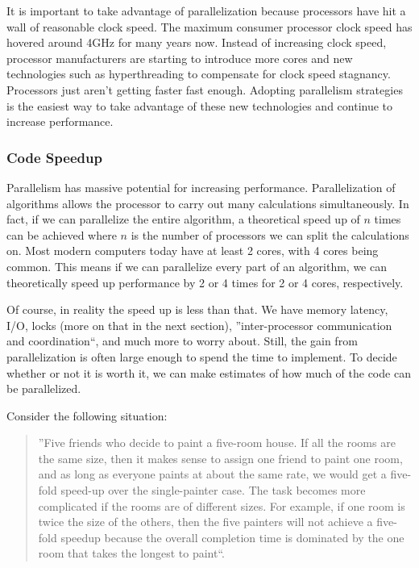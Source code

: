 \documentclass[letterpaper, 11pt]{article}
\begin{document}
\par\vspace{\baselineskip}

It is important to take advantage of parallelization because processors have hit a wall of
reasonable clock speed\citep{processorspeed}. The maximum consumer processor clock speed has
hovered around 4GHz for many years now. Instead of increasing clock speed, processor
manufacturers are starting to introduce more cores and new technologies such as hyperthreading
to compensate for clock speed stagnancy. Processors just aren't getting faster fast enough.
Adopting parallelism strategies is the easiest way to take advantage of these new technologies
and continue to increase performance.

\subsubsection{Code Speedup}
Parallelism has massive potential for increasing performance. Parallelization of algorithms
allows the processor to carry out many calculations simultaneously. In fact, if we can
parallelize the entire algorithm, a theoretical speed up of $n$ times can be
achieved where $n$ is the number of processors we can split the calculations on.
Most modern computers today have at least 2 cores, with 4 cores being common. This means
if we can parallelize every part of an algorithm, we can theoretically speed up performance
by 2 or 4 times for 2 or 4 cores, respectively.

\par\vspace{\baselineskip}
Of course, in reality the speed up is less than that. We have memory latency, I/O, locks
(more on that in the next section), ''inter-processor communication and coordination``\citep[p. 13]{artofmulti},
and much more to worry about. Still, the gain from parallelization is often large enough to spend
the time to implement. To decide whether or not it is worth it, we can make estimates of
how much of the code can be parallelized.

\par\vspace{\baselineskip}

\newpage
Consider the following situation:
\begin{quotation}
	''Five friends who decide to paint a five-room house. If all the rooms are the same size,
	then it makes sense to assign one friend to paint one room, and as long as everyone paints at
	about the same rate, we would get a five-fold speed-up over the single-painter case.
	The task becomes more complicated if the rooms are of different sizes. For example, if one
	room is twice the size of the others, then the five painters will not achieve a five-fold
	speedup because the overall completion time is dominated by the one room that takes the
	longest to paint``\citep[p. 13]{artofmulti}.
\end{quotation}
\end{document}
